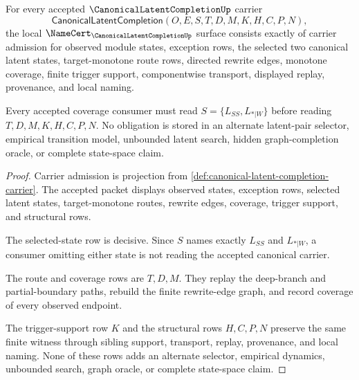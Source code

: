 \begin{theorem}
\label{thm:canonical-latent-completion-namecert-obligations}
For every accepted $\CanonicalLatentCompletionUp$ carrier
$$
\mathsf{CanonicalLatentCompletion}(O,E,S,T,D,M,K,H,C,P,N),
$$
the local $\NameCert_{\CanonicalLatentCompletionUp}$ surface consists exactly of carrier admission for observed module states, exception rows, the selected two canonical latent states, target-monotone route rows, directed rewrite edges, monotone coverage, finite trigger support, componentwise transport, displayed replay, provenance, and local naming.

Every accepted coverage consumer must read $S=\{L_{SS},L_{*|W}\}$ before reading $T,D,M,K,H,C,P,N$. No obligation is stored in an alternate latent-pair selector, empirical transition model, unbounded latent search, hidden graph-completion oracle, or complete state-space claim.
\end{theorem}
\begin{proof}
Carrier admission is projection from \autoref{def:canonical-latent-completion-carrier}. The accepted packet displays observed states, exception rows, selected latent states, target-monotone routes, rewrite edges, coverage, trigger support, and structural rows.

The selected-state row is decisive. Since $S$ names exactly $L_{SS}$ and $L_{*|W}$, a consumer omitting either state is not reading the accepted canonical carrier.

The route and coverage rows are $T,D,M$. They replay the deep-branch and partial-boundary paths, rebuild the finite rewrite-edge graph, and record coverage of every observed endpoint.

The trigger-support row $K$ and the structural rows $H,C,P,N$ preserve the same finite witness through sibling support, transport, replay, provenance, and local naming. None of these rows adds an alternate selector, empirical dynamics, unbounded search, graph oracle, or complete state-space claim.
\end{proof}

